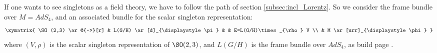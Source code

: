 If one wants to see singletons as a field theory, we have to follow the path of section \ref{subsec:incl_Lorentz}. So we consider the frame bundle over $M=AdS_4$, and an associated bundle for the scalar singleton representation:
\begin{equation}
 \xymatrix{
	\SO(2,3)  \ar@{~>}[r]	& L(G/H) \ar[d]_{\displaystyle \pi}	&	& E=L(G/H)\times_{\rho} V \\
				& M \ar[urr]_{\displaystyle\phi}	  
  }
\end{equation}
where $(V,\rho)$ is the scalar singleton representation of $\SO(2,3)$, and $L(G/H)$ is the frame bundle over $AdS_4$, as build page \pageref{PgFrameHomo}.
